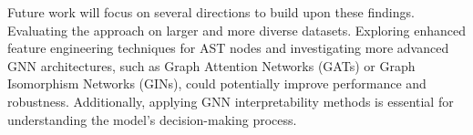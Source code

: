 \documentclass[sigplan,screen]{acmart}
\begin{document}
Future work will focus on several directions to build upon these findings. Evaluating the approach on larger and more diverse datasets. Exploring enhanced feature engineering techniques for AST nodes and investigating more advanced GNN architectures, such as Graph Attention Networks (GATs) or Graph Isomorphism Networks (GINs), could potentially improve performance and robustness. Additionally, applying GNN interpretability methods is essential for understanding the model's decision-making process. 





\end{document}
